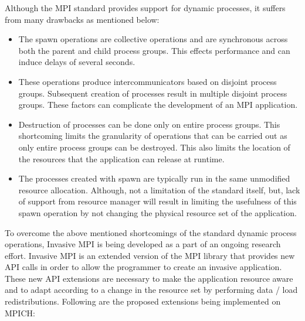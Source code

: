 Although the MPI standard provides support for dynamic processes, it suffers from many drawbacks as mentioned below:
\begin{itemize}
\item The spawn operations are collective operations and are synchronous across both the parent and child process groups. This effects performance and can induce delays of several seconds.
\item These operations produce intercommunicators based on disjoint process groups. Subsequent creation of processes result in multiple disjoint process groups. These factors can complicate the development of an MPI application.
\item Destruction of processes can be done only on entire process groups. This shortcoming limits the granularity of operations that can be carried out as only entire process groups can be destroyed. This also limits the location of the resources that the application can release at runtime.
\item The processes created with spawn are typically run in the same unmodified resource allocation. Although, not a limitation of the standard itself, but, lack of support from resource manager will result in limiting the usefulness of this spawn operation by not changing the physical resource set of the application.
\end{itemize}

To overcome the above mentioned shortcomings of the standard dynamic process operations, Invasive MPI is being developed as a part of an ongoing research effort. Invasive MPI is an extended version of the MPI library that provides new API calls in order to allow the programmer to create an invasive application. These new API extensions are necessary to make the application resource aware and to adapt according to a change in the resource set by performing data / load redistributions. Following are the proposed extensions being implemented on MPICH:

